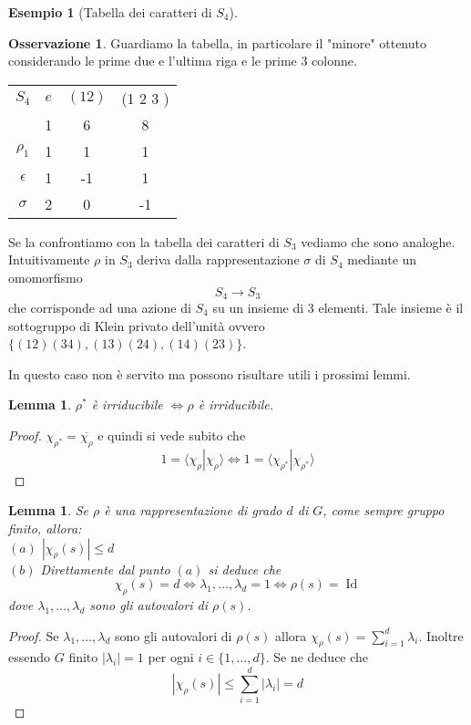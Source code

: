 \documentclass[11pt]{article}
\theoremstyle{plain}
\newtheorem{lemma}[thm]{Lemma}
\theoremstyle{definition}
\newtheorem{exmp}{Esempio}[section]
\newtheorem*{rem}{Osservazione}
\theoremstyle{remark}
\DeclareMathOperator{\Id}{Id}
\begin{document}
\begin{exmp}[Tabella dei caratteri di $S_4$]
\begin{rem} Guardiamo la tabella, in particolare il "minore" ottenuto considerando le prime due e l'ultima riga e le prime 3 colonne.

\begin{table}[!ht]
\centering
\begin{tabular}{|c|c|c|c|}
\hline
$S_4$  & $e$ & $(1 2)$ & (1 2 3 )    \\
 & 1 & 6 & 8 \\
\hline
 $\rho_1$ & 1 & 1  & 1 \\
\hline
$\epsilon$ & 1 & -1 & 1 \\
\hline
$\sigma$ & 2 & 0 & -1 \\
\hline
\end{tabular}
\end{table}
Se la confrontiamo con la tabella dei caratteri di $S_3$ vediamo che sono analoghe. Intuitivamente $\rho$ in $S_3$ deriva dalla rappresentazione $\sigma$ di $S_4$ mediante un omomorfismo
\[S_4\rightarrow S_3\]
che corrisponde ad una azione di $S_4$ su un insieme di 3 elementi. Tale insieme è il sottogruppo di Klein privato dell'unità ovvero
$\{ (12)(34),(13)(24),(14)(23)\}$.
\end{rem}


In questo caso non è servito ma possono risultare utili i prossimi lemmi.
\begin{lemma}
$\rho^* $ è irriducibile $ \Leftrightarrow \rho$ è irriducibile.
\end{lemma}
\begin{proof} $\chi_{\rho^*}=\overline{\chi_\rho} $ e quindi si vede subito che
\[
1=\langle\chi_{\rho}|\chi_{\rho}\rangle \Leftrightarrow 1=\langle\chi_{\rho^*}|\chi_{\rho^*}\rangle
\]
\end{proof}

\begin{lemma}
Se $\rho$ è una rappresentazione di grado $d$ di $G$, come sempre gruppo finito, allora:\\
$(a)$ $|\chi_{\rho}(s)|\leq d$ \\
$(b)$ Direttamente dal punto $(a)$ si deduce che
\[
\chi_{\rho}(s)=d\Leftrightarrow \lambda_1,\ldots,\lambda_d=1\Leftrightarrow \rho(s)=\Id
\]
dove $\lambda_1,\ldots,\lambda_d$ sono gli autovalori di $\rho(s)$.
\end{lemma}

\begin{proof}
 Se $\lambda_1,\ldots,\lambda_d$ sono gli autovalori di $\rho(s)$ allora $\chi_{\rho}(s)=\sum_{i=1}^{d}\lambda_i$.
 Inoltre essendo $G$ finito $|\lambda_i|=1$ per ogni $i\in \{1,\ldots,d\}$. Se ne deduce che
\[
|\chi_{\rho}(s)|\leq \sum_{i=1}^d |\lambda_i|=d
\]
\end{proof}
\end{exmp}
\end{document}
